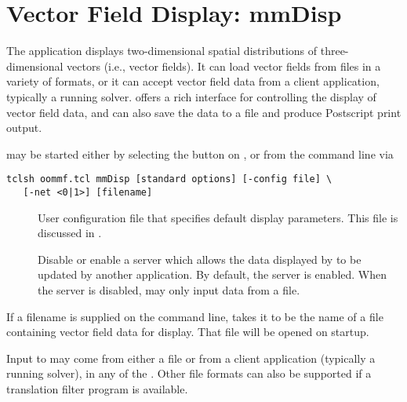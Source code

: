 \section{Vector Field Display: mmDisp}\label{sec:mmdisp}%

\begin{center}
\end{center}

The application  displays two-dimensional spatial
distributions of three-dimensional vectors (i.e., vector fields).  It
can load vector fields from files in a variety of formats, or it can
accept vector field data from a client application, typically a running
solver.   offers a rich interface for
controlling the display of vector field data, and can also save the data
to a file and produce Postscript print output.

 may be started either by selecting the  button
on , or from the command line via
\begin{verbatim}
tclsh oommf.tcl mmDisp [standard options] [-config file] \
   [-net <0|1>] [filename]
\end{verbatim}

\begin{description}
\item[]
  User configuration file that specifies default display parameters.
  This file is discussed in
  .
\item[]
  Disable or enable a server which allows the data displayed by
   to be updated by another application.
  By default, the server is enabled.  When the server is disabled,
  \app{mmDisp} may only input data from a file.
\end{description}

If a filename is supplied on the command line,  takes
it to be the name of a file containing vector field data for display.
That file will be opened on startup.

Input to  may come from either a file or from a client
application (typically a running solver), in any of the
.
Other file formats can also be supported if a translation filter program
is available.

